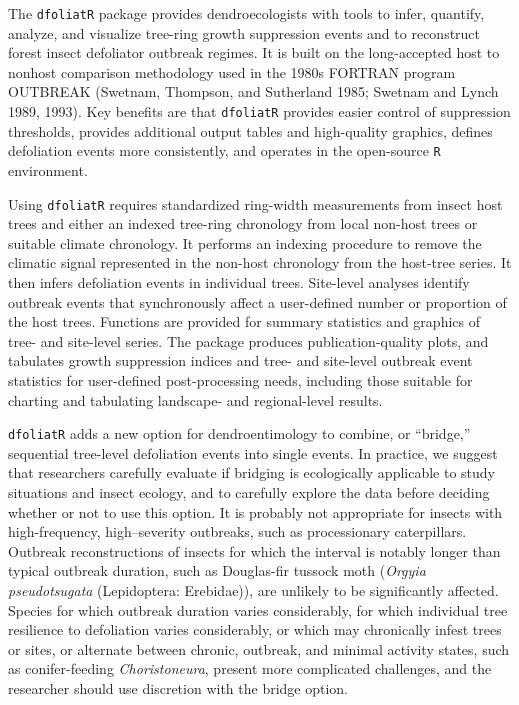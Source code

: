 \documentclass[review]{elsarticle} %
\begin{document}
The \texttt{dfoliatR} package provides dendroecologists with tools to infer, quantify, analyze, and visualize tree-ring growth suppression events and to reconstruct forest insect defoliator outbreak regimes. It is built on the long-accepted host to nonhost comparison methodology used in the 1980s FORTRAN program OUTBREAK (Swetnam, Thompson, and Sutherland 1985; Swetnam and Lynch 1989, 1993). Key benefits are that \texttt{dfoliatR} provides easier control of suppression thresholds, provides additional output tables and high-quality graphics, defines defoliation events more consistently, and operates in the open-source \texttt{R} environment.

Using \texttt{dfoliatR} requires standardized ring-width measurements from insect host trees and either an indexed tree-ring chronology from local non-host trees or suitable climate chronology. It performs an indexing procedure to remove the climatic signal represented in the non-host chronology from the host-tree series. It then infers defoliation events in individual trees. Site-level analyses identify outbreak events that synchronously affect a user-defined number or proportion of the host trees. Functions are provided for summary statistics and graphics of tree- and site-level series. The package produces publication-quality plots, and tabulates growth suppression indices and tree- and site-level outbreak event statistics for user-defined post-processing needs, including those suitable for charting and tabulating landscape- and regional-level results.

\texttt{dfoliatR} adds a new option for dendroentimology to combine, or ``bridge,'' sequential tree-level defoliation events into single events. In practice, we suggest that researchers carefully evaluate if bridging is ecologically applicable to study situations and insect ecology, and to carefully explore the data before deciding whether or not to use this option. It is probably not appropriate for insects with high-frequency, high--severity outbreaks, such as processionary caterpillars. Outbreak reconstructions of insects for which the interval is notably longer than typical outbreak duration, such as Douglas-fir tussock moth (\emph{Orgyia pseudotsugata} (Lepidoptera: Erebidae)), are unlikely to be significantly affected. Species for which outbreak duration varies considerably, for which individual tree resilience to defoliation varies considerably, or which may chronically infest trees or sites, or alternate between chronic, outbreak, and minimal activity states, such as conifer-feeding \emph{Choristoneura}, present more complicated challenges, and the researcher should use discretion with the bridge option.
\end{document}
